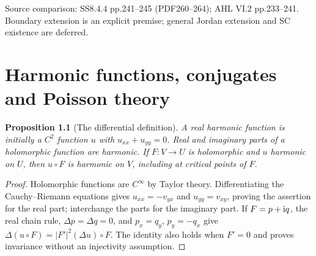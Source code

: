 \documentclass[11pt,a4paper,openany]{book}
\newtheorem{proposition}[theorem]{Proposition}
\theoremstyle{definition}
\theoremstyle{remark}\newtheorem{remark}[theorem]{Remark}
\newcommand{\family}[1]{}
\newcommand{\source}[1]{\par\begingroup\small\sffamily\color{black!65}Source comparison: #1\par\endgroup}
\begin{document}
\source{SS8.4.4 pp.241--245 (PDF260--264); AHL VI.2 pp.233--241. Boundary extension is an explicit premise; general Jordan extension and SC existence are deferred.}



\chapter{Harmonic functions, conjugates and Poisson theory}\label{ch:d12-13}

\begin{proposition}[The differential definition]\family{D12.13.01}\label{d12:13-01}
A real harmonic function is initially a $C^2$ function $u$ with $u_{xx}+u_{yy}=0$. Real and imaginary parts of a holomorphic function are harmonic. If $F:V\to U$ is holomorphic and $u$ harmonic on $U$, then $u\circ F$ is harmonic on $V$, including at critical points of $F$.
\end{proposition}
\begin{proof}
Holomorphic functions are $C^\infty$ by Taylor theory. Differentiating the Cauchy--Riemann equations gives $u_{xx}=-v_{yx}$ and $u_{yy}=v_{xy}$, proving the assertion for the real part; interchange the parts for the imaginary part. If $F=p+\mathrm i q$, the real chain rule, $\Delta p=\Delta q=0$, and $p_x=q_y$, $p_y=-q_x$ give
$\Delta(u\circ F)=|F'|^2(\Delta u)\circ F$. The identity also holds when $F'=0$ and proves invariance without an injectivity assumption.
\end{proof}
\end{document}
